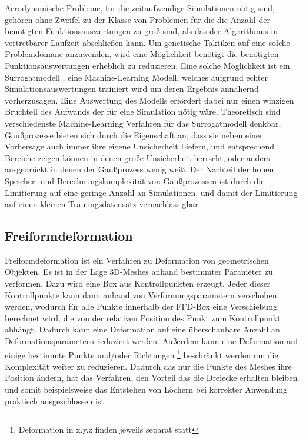 \documentclass[12pt]{article}
\begin{document}
Aerodynamische Probleme, für die zeitaufwendige Simulationen nötig sind, gehören ohne Zweifel zu der Klasse von Problemen für die die Anzahl der benötigten Funktionsauswertungen zu groß sind, als das der Algorithmus in vertretbarer Laufzeit abschließen kann.
Um genetische Taktiken auf eine solche Problemdomäne anzuwenden, wird eine Möglichkeit benötigt die benötigten Funktionsauswertungen erheblich zu reduzieren.
Eine solche Möglichkeit ist ein Surrogatmodell \cite{Jin.2011}\cite{Preen.2016}, eine Machine-Learning Modell, welches aufgrund echter Simulationsauswertungen trainiert wird um deren Ergebnis annähernd vorherzusagen.
Eine Auswertung des Modells erfordert dabei nur einen winzigen Bruchteil des Aufwands der für eine Simulation nötig wäre.
Theoretisch sind verschiedenste Machine-Learning Verfahren für das Surrogatmodell denkbar, Gaußprozesse \cite{Rasmussen.2008} bieten sich durch die Eigenschaft an, dass sie neben einer Vorhersage auch immer ihre eigene Unsicherheit Liefern, und entsprechend Bereiche zeigen können in denen große Unsicherheit herrscht, oder anders ausgedrückt in denen der Gaußprozess wenig weiß.
Der Nachteil der hohen Speicher- und Berechnungskomplexität von Gaußprozessen ist durch die Limitierung auf eine geringe Anzahl an Simulationen, und damit der Limitierung auf einen kleinen Trainingsdatensatz vernachlässigbar.

\subsection{Freiformdeformation}

Freiformdeformation\cite{Sederberg.1986} ist ein Verfahren zu Deformation von geometrischen Objekten.
Es ist in der Lage 3D-Meshes anhand bestimmter Parameter zu verformen.
Dazu wird eine Box aus Kontrollpunkten erzeugt.
Jeder dieser Kontrollpunkte kann dann anhand von Verformungsparametern verschoben werden, wodurch für alle Punkte innerhalb der FFD-Box eine Verschiebung berechnet wird, die von der relativen Position des Punkt zum Kontrollpunkt abhängt.
Dadurch kann eine Deformation auf eine überschaubare Anzahl an Deformationsparametern reduziert werden.
Außerdem kann eine Deformation auf einige bestimmte Punkte und/oder Richtungen
\footnote{Deformation in x,y,z finden jeweils separat statt} 
beschränkt werden um die Komplexität weiter zu reduzieren.
Dadurch das nur die Punkte des Meshes ihre Position ändern, hat das Verfahren, den Vorteil das die Dreiecke erhalten bleiben und somit beispielsweise das Entstehen von Löchern bei korrekter Anwendung praktisch ausgeschlossen ist.
\end{document}
